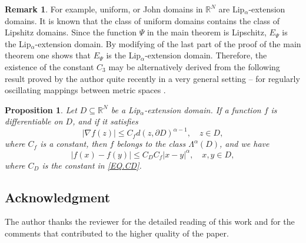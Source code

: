 \documentclass[10pt]{amsart}
\newtheorem{proposition}[theorem]{Proposition}
\theoremstyle{definition}
\newtheorem{remark}[theorem]{Remark}
\numberwithin{equation}{section}
\begin{document}
\begin{remark}
For example,   uniform, or John   domains  in  $\mathbb{R}^N$  are Lip$_\alpha$-extension domains. It is known that  the
class  of   uniform domains  contains  the class of Lipshitz domains. Since the function  $\Psi$    in the main  theorem
is    Lipschitz,   $E_\Psi$ is the  Lip$_\alpha$-extension  domain. By modifying of  the last part of the  proof of  the
main  theorem one shows that $E_\Psi$  is the  Lip$_\alpha$-extension  domain. Therefore, the existence of the  constant
$C_3$ may be alternatively derived from the following result proved       by the author quite recently in a very general
setting -- for regularly  oscillating  mappings between  metric spaces \cite{MARKOVIC.JGA}.

\begin{proposition}
Let $D\subseteq \mathbb {R}^N$ be a Lip$_\alpha$-extension domain.  If a function  $f$ is differentiable on $D$, and  if
it  satisfies
\begin{equation*}
|\nabla f(z)| \le C_f d(z, \partial D)^{\alpha-1},\quad z\in  D,
\end{equation*}
where $C_f$ is a constant, then   $f$   belongs to the class $\Lambda^\alpha(D)$,  and we have
\begin{equation*}
|f(x)- f(y)|\le  C_D C_f |x-y|^{\alpha},\quad x, y\in D,
\end{equation*}
where $C_D$ is the constant  in \eqref{EQ.CD}.
\end{proposition}
\end{remark}

\subsection*{Acknowledgment}
The       author thanks the reviewer for the detailed reading of this work and for the comments that contributed to  the
higher quality of the  paper.
\end{document}
